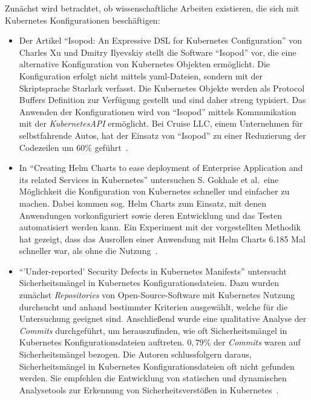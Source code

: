 Zunächst wird betrachtet, ob wissenschaftliche Arbeiten existieren, die sich mit Kubernetes Konfigurationen beschäftigen:
\begin{itemize}
      \item Der Artikel ``Isopod: An Expressive DSL for Kubernetes Configuration'' von Charles Xu und Dmitry Ilyevskiy stellt die
            Software ``Isopod'' vor, die eine alternative Konfiguration von Kubernetes Objekten ermöglicht. Die Konfiguration erfolgt nicht mittels \ac{yaml}-Dateien,
            sondern mit der Skriptsprache Starlark verfasst. Die Kubernetes Objekte werden als Protocol Buffers Definition zur Verfügung gestellt und sind daher streng typisiert.
            Das Anwenden der Konfigurationen wird von ``Isopod'' mittels Kommunikation mit der \textit{KubernetesAPI} ermöglicht.
            Bei Cruise LLC, einem Unternehmen für selbstfahrende Autos, hat der Einsatz von ``Isopod'' zu einer Reduzierung der Codezeilen um $60\%$ geführt~\cite{10.1145/3357223.3365759}.
      \item In ``Creating Helm Charts to ease deployment of Enterprise Application and its related Services in Kubernetes'' untersuchen
            S. Gokhale et al.\ eine Möglichkeit die Konfiguration von Kubernetes schneller und einfacher zu machen. Dabei kommen sog. Helm Charts zum Einsatz,
            mit denen Anwendungen vorkonfiguriert sowie deren Entwicklung und das Testen automatisiert werden kann. Ein Experiment mit der vorgestellten Methodik
            hat gezeigt, dass das Ausrollen einer Anwendung mit Helm Charts 6.185 Mal schneller war, als ohne die Nutzung~\cite{9776450}.
      \item ``'Under-reported' Security Defects in Kubernetes Manifests'' untersucht Sicherheitsmängel in Kubernetes Konfigurationsdateien.
            Dazu wurden zunächst \textit{Repositories} von Open-Source-Software mit Kubernetes Nutzung durchsucht und anhand bestimmter Kriterien ausgewählt, welche für
            die Untersuchung geeignet sind. Anschließend wurde eine qualitative Analyse der \textit{Commits} durchgeführt, um herauszufinden, wie oft Sicherheitsmängel in Kubernetes
            Konfigurationsdateien auftreten. $0,79\%$ der \textit{Commits} waren auf Sicherheitsmängel bezogen. Die Autoren schlussfolgern daraus,
            Sicherheitsmängel in Kubernetes Konfigurationsdateien oft nicht gefunden werden. Sie empfehlen die Entwicklung von statischen und dynamischen Analysetools
            zur Erkennung von Sicherheitsverstößen in Kubernetes~\cite{9476056}.
\end{itemize}

